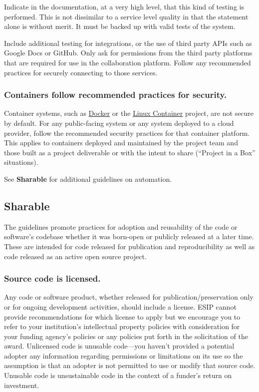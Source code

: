 \documentclass{article}
\begin{document}
Indicate in the documentation, at a very high level, that this kind of testing is performed. This is not dissimilar to a service level quality in that the statement alone is without merit. It must be backed up with valid tests of the system.
 
Include additional testing for integrations, or the use of third party APIs such as Google Docs or GitHub. Only ask for permissions from the third party platforms that are required for use in the collaboration platform. Follow any recommended practices for securely connecting to those services.

\subsubsection{Containers follow recommended practices for security.}
Container systems, such as \href{http://www.docker.com/} {Docker} \autocite{_dockerintroduction_2015} or the \href{https://linuxcontainers.org/} {Linux Container} project, are not secure by default. For any public-facing system or any system deployed to a cloud provider, follow the recommended security practices for that container platform. This applies to containers deployed and maintained by the project team and those built as a project deliverable or with the intent to share (“Project in a Box” situations). 

See \textbf{Sharable} for additional guidelines on automation. 

\subsection{Sharable}
The guidelines promote practices for adoption and reusability of the code or software’s codebase whether it was born-open or publicly released at a later time. These are intended for code released for publication and reproducibility as well as code released as an active open source project.

\subsubsection{Source code is licensed.}
Any code or software product, whether released for publication/preservation only or for ongoing development activities, should include a license. ESIP cannot provide recommendations for which license to apply but we encourage you to refer to your institution’s intellectual property policies with consideration for your funding agency’s policies or any policies put forth in the solicitation of the award. Unlicensed code is unusable code—you haven’t provided a potential adopter any information regarding permissions or limitations on its use so the assumption is that an adopter is not permitted to use or modify that source code. Unusable code is unsustainable code in the context of a funder’s return on investment.
 
\end{document}
